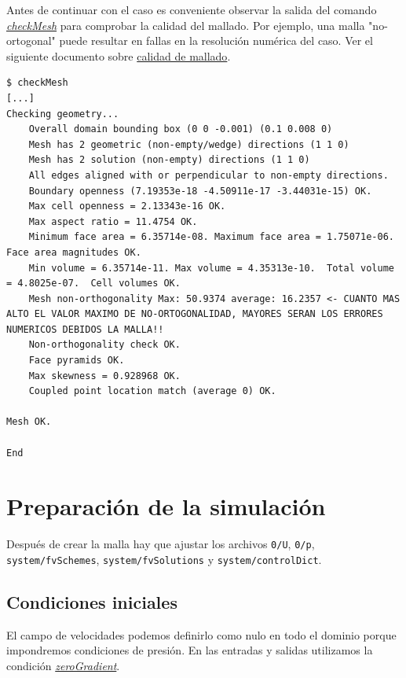 \documentclass{article}
\begin{document}
Antes de continuar con el caso es conveniente observar la salida del comando \textit{\href{https://openfoamwiki.net/index.php/CheckMesh}{checkMesh}} para comprobar la calidad del mallado. Por ejemplo, una malla "no-ortogonal" puede resultar en fallas en la resolución numérica del caso. Ver el siguiente documento sobre \href{http://www.wolfdynamics.com/wiki/meshing_preliminaries_and_quality_assessment.pdf}{calidad de mallado}.
\begin{lstlisting}
$ checkMesh
[...]
Checking geometry...
    Overall domain bounding box (0 0 -0.001) (0.1 0.008 0)
    Mesh has 2 geometric (non-empty/wedge) directions (1 1 0)
    Mesh has 2 solution (non-empty) directions (1 1 0)
    All edges aligned with or perpendicular to non-empty directions.
    Boundary openness (7.19353e-18 -4.50911e-17 -3.44031e-15) OK.
    Max cell openness = 2.13343e-16 OK.
    Max aspect ratio = 11.4754 OK.
    Minimum face area = 6.35714e-08. Maximum face area = 1.75071e-06.  Face area magnitudes OK.
    Min volume = 6.35714e-11. Max volume = 4.35313e-10.  Total volume = 4.8025e-07.  Cell volumes OK.
    Mesh non-orthogonality Max: 50.9374 average: 16.2357 <- CUANTO MAS ALTO EL VALOR MAXIMO DE NO-ORTOGONALIDAD, MAYORES SERAN LOS ERRORES NUMERICOS DEBIDOS LA MALLA!!
    Non-orthogonality check OK.
    Face pyramids OK.
    Max skewness = 0.928968 OK.
    Coupled point location match (average 0) OK.

Mesh OK.

End

\end{lstlisting}

\section{Preparación de la simulación}
Después de crear la malla hay que ajustar los archivos \texttt{0/U}, \texttt{0/p},\\ \texttt{system/fvSchemes}, \texttt{system/fvSolutions} y \texttt{system/controlDict}.

\subsection{Condiciones iniciales}
El campo de velocidades podemos definirlo como nulo en todo el dominio porque impondremos condiciones de presión. En las entradas y salidas utilizamos la condición \textit{\href{https://www.cfdsupport.com/OpenFOAM-Training-by-CFD-Support/node113.html}{zeroGradient}}. 
\end{document}
